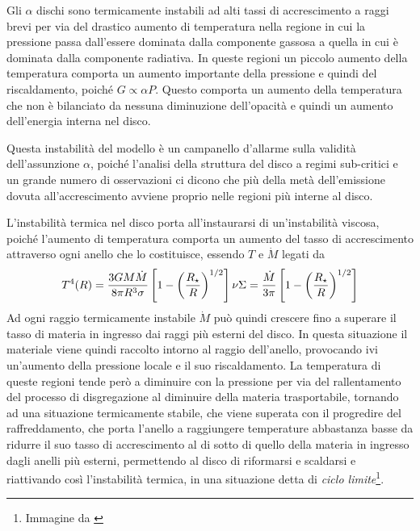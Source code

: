 \documentclass[a4paperbi]{article}
\begin{document}
	Gli $\alpha$ dischi sono termicamente instabili ad alti tassi di accrescimento a raggi brevi per via del drastico aumento di temperatura nella regione in cui la pressione passa dall'essere dominata dalla componente gassosa a quella in cui è dominata dalla componente radiativa. In queste regioni un piccolo aumento della temperatura comporta un aumento importante della pressione e quindi del riscaldamento, poiché $G\propto\alpha P$. Questo comporta un aumento della temperatura che non è bilanciato da nessuna diminuzione dell'opacità e quindi un aumento dell'energia interna nel disco.
	 
	Questa instabilità del modello è un campanello d'allarme sulla validità dell'assunzione $\alpha$, poiché l'analisi della struttura del disco a regimi sub-critici e un grande numero di osservazioni ci dicono che più della metà dell'emissione dovuta all'accrescimento avviene proprio nelle regioni più interne al disco.
	
	L'instabilità termica nel disco porta all'instaurarsi di un'instabilità viscosa, poiché l'aumento di temperatura comporta un aumento del tasso di accrescimento attraverso ogni anello che lo costituisce, essendo $T$ e $\dot{M}$ legati da
	\begin{equation*}
		T^4(R)=\frac{3GM\dot{M}}{8\pi R^3\sigma}\left[1-\left(\frac{R_{\star}}{R}\right)^{1/2}\right]\\
		\nu\Sigma=\frac{\dot{M}}{3\pi}\left[1-\left(\frac{R_{\star}}{R}\right)^{1/2}\right]
	\end{equation*}
	Ad ogni raggio termicamente instabile $\dot{M}$ può quindi crescere fino a superare il tasso di materia in ingresso dai raggi più esterni del disco. In questa situazione il materiale viene quindi raccolto intorno al raggio dell'anello, provocando ivi un'aumento della pressione locale e il suo riscaldamento. La temperatura di queste regioni tende però a diminuire con la pressione per via del rallentamento del processo di disgregazione al diminuire della materia trasportabile, tornando ad una situazione termicamente stabile, che viene superata con il progredire del raffreddamento, che porta l'anello a raggiungere temperature abbastanza basse da ridurre il suo tasso di accrescimento al di sotto di quello della materia in ingresso dagli anelli più esterni, permettendo al disco di riformarsi e scaldarsi e riattivando così l'instabilità termica, in una situazione detta di \textit{ciclo limite}\footnote{Immagine da \cite{FrankKingRaineAccretionPower}}.
\end{document}
